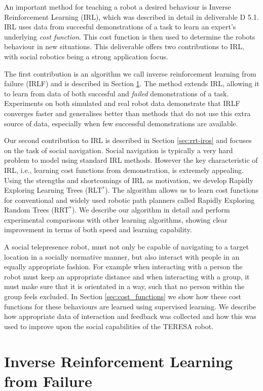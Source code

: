 \documentclass[a4paper,11pt]{report}
\begin{document}
An important method for teaching a robot a desired behaviour is Inverse Reinforcement Learning (IRL), which was described in detail in deliverable D 5.1. IRL uses data from succesful demonstrations of a task to learn an expert's underlying \emph{cost function}. This cost function is then used to determine the robots behaviour in new situations. This deliverable offers two contributions to IRL, with social robotics being a strong application focus.

The first contribution is an algorithm we call inverse reinforcement learning from failure (IRLF) and is described in Section \ref{sec:irlf}. The method extends IRL, allowing it to learn from data of both succesful and \emph{failed} demonstrations of a task. Experiments on both simulated and real robot data demonstrate that IRLF converges faster and generalises better than methods that do not use this extra source of data, especially when few successful demonstrations are available. 

Our second contribution to IRL is described in Section \ref{sec:rrt-iros} and focuses on the task of social navigation. Social navigation is typically a very hard problem to model using standard IRL methods. However the key characteristic of IRL, i.e., learning cost functions from demonstration, is extremely appealing. Using the strengths and shortcomings of IRL as motivation, we develop Rapidly Exploring Learning Trees (RLT$^*$). The algorithm allows us to learn cost functions for conventional and widely used robotic path planners called Rapidly Exploring Random Trees (RRT$^*$). We describe our algorithm in detail and perform experimental comparisons with other learning algorithms, showing clear improvement in terms of both speed and learning capability.

A social telepresence robot, must not only be capable of navigating to a target location in a socially normative manner, but also interact with people in an equally appropriate fashion. For example when interacting with a person the robot must keep an appropriate distance and when interacting with a group, it must make sure that it is orientated in a way, such that no person within the group feels excluded. In Section \ref{sec:cost_functions} we show how these cost functions for these behaviours are learned using supervised learning. We describe how appropriate data of interaction and feedback was collected and how this was used to improve upon the social capabilities of the TERESA robot.

\section{Inverse Reinforcement Learning from Failure}
\label{sec:irlf}
\end{document}
